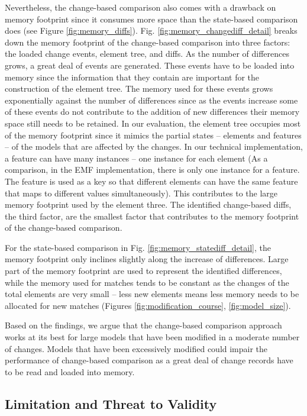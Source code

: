 \documentclass{llncs}
\begin{document}
Nevertheless, the change-based comparison also comes with a drawback on memory footprint since it consumes more space than the state-based comparison does (see Figure \ref{fig:memory_diffs}). Fig. \ref{fig:memory_changediff_detail} breaks down the memory footprint of the change-based comparison into three factors: the loaded change events, element tree, and diffs. As the number of differences grows, a great deal of events are generated. These events have to be loaded into memory since the information that they contain are important for the construction of the element tree. The memory used for these events grows exponentially against the number of differences since as the events increase some of these events do not contribute to the addition of new differences their memory space still needs to be retained. In our evaluation, the element tree occupies most of the memory footprint since it mimics the partial states -- elements and features -- of the models that are affected by the changes. In our technical implementation, a feature can have many instances -- one instance for each element (As a comparison, in the EMF implementation, there is only one instance for a feature. The feature is used as a key so that different elements can have the same feature that maps to different values simultaneously). This contributes to the large memory footprint used by the element three. The identified change-based diffs, the third factor, are the smallest factor that contributes to the memory footprint of the change-based comparison. 

For the state-based comparison in Fig. \ref{fig:memory_statediff_detail}, the memory footprint only inclines slightly along the increase of differences. Large part of the memory footprint are used to represent the identified differences, while the memory used for matches tends to be constant as the changes of the total elements are very small -- less new elements means less memory needs to be allocated for new matches (Figures \ref{fig:modification_course}, \ref{fig:model_size}). 

Based on the findings, we argue that the change-based comparison approach works at its best for large models that have been modified in a moderate number of changes. Models that have been excessively modified could impair the performance of change-based comparison as a great deal of change records have to be read and loaded into memory. 

\subsection{Limitation and Threat to Validity}
\label{sec:limitation_and_Threat_to_validity}
\end{document}
